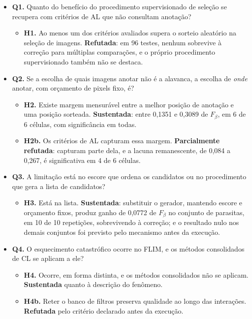 \begin{itemize}

\item \textbf{Q1.} Quanto do benefício do procedimento supervisionado de seleção se recupera com critérios de \ac{AL} que não consultam anotação?
\begin{itemize}
\item \textbf{H1.} Ao menos um dos critérios avaliados supera o sorteio aleatório na seleção de imagens. \textbf{Refutada}: em 96 testes, nenhum sobrevive à correção para múltiplas comparações, e o próprio procedimento supervisionado também não se destaca.
\end{itemize}

\item \textbf{Q2.} Se a escolha de quais imagens anotar não é a alavanca, a escolha de \emph{onde} anotar, com orçamento de pixels fixo, é?
\begin{itemize}
\item \textbf{H2.} Existe margem mensurável entre a melhor posição de anotação e uma posição sorteada. \textbf{Sustentada}: entre 0,1351 e 0,3089 de $F_\beta$, em 6 de 6 células, com significância em todas.
\item \textbf{H2b.} Os critérios de \ac{AL} capturam essa margem. \textbf{Parcialmente refutada}: capturam parte dela, e a lacuna remanescente, de 0,084 a 0,267, é significativa em 4 de 6 células.
\end{itemize}

\item \textbf{Q3.} A limitação está no escore que ordena os candidatos ou no procedimento que gera a lista de candidatos?
\begin{itemize}
\item \textbf{H3.} Está na lista. \textbf{Sustentada}: substituir o gerador, mantendo escore e orçamento fixos, produz ganho de 0,0772 de $F_\beta$ no conjunto de parasitas, em 10 de 10 repetições, sobrevivendo à correção; e o resultado nulo nos demais conjuntos foi previsto pelo mecanismo antes da execução.
\end{itemize}

\item \textbf{Q4.} O esquecimento catastrófico ocorre no \ac{FLIM}, e os métodos consolidados de \ac{CL} se aplicam a ele?
\begin{itemize}
\item \textbf{H4.} Ocorre, em forma distinta, e os métodos consolidados não se aplicam. \textbf{Sustentada} quanto à descrição do fenômeno.
\item \textbf{H4b.} Reter o banco de filtros preserva qualidade ao longo das interações. \textbf{Refutada} pelo critério declarado antes da execução.
\end{itemize}


\end{itemize}
